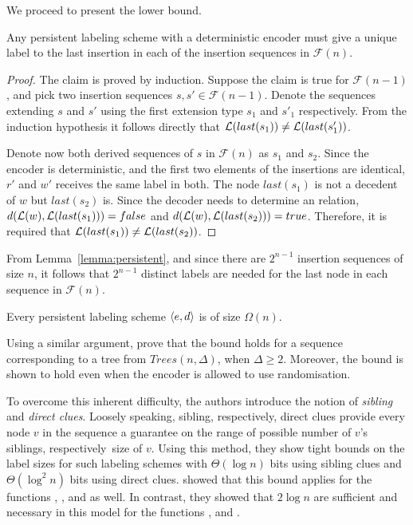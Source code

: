 			We proceed to present the lower bound.
			\begin{lemma}\label{lemma:persistent}\cite{Kaplan01}
				Any  persistent  \ancestry labeling scheme with a deterministic encoder must give a unique label to the last insertion in  each of the  insertion sequences in $\mathcal{F}(n)$. 
			\end{lemma}

			\begin{proof}
				The claim is proved by induction.
				Suppose the claim is true for $\mathcal{F}(n-1)$, and pick two  insertion sequences $s, s' \in \mathcal{F}(n-1)$.
				 Denote the  sequences  extending  $s$ and $s'$ using  the first extension  type $s_1$ and $s'_1$ respectively.
				From the induction hypothesis it follows directly that $ \mathcal{L}(last(s_1)) \neq  \mathcal{L}(last(s_1'))$. %
				
				Denote now both  derived sequences of $s$ in $\mathcal{F}(n)$ as  $s_1$ and $s_2$.
				Since the encoder is deterministic, and the first two elements of the insertions are identical,  $r'$ and $w'$ receives the same label in both.
				The node $last(s_1)$ is not a decedent of $w$ but $last(s_2)$ is.
				 Since the decoder needs to determine an \ancestry relation, $d( \mathcal{L}(w), \mathcal{L}(last(s_1))) = false$ and $d( \mathcal{L}(w), \mathcal{L}(last(s_2))) = true$.
				  Therefore, it is required that $ \mathcal{L}(last(s_1)) \neq  \mathcal{L}(last(s_2))$. 
			\end{proof}
				
				From Lemma~\ref{lemma:persistent}, and since there are $2^{n-1}$ insertion sequences of size $n$, it follows that $2^{n-1}$ distinct labels are needed for the last node in each sequence in $\mathcal{F}(n)$.
			\begin{corollary} \label{cor:persistent}
				Every persistent \ancestry labeling scheme  $\left \langle e,d \right \rangle $ is of size $\Omega(n)$.
			\end{corollary}
			Using a similar argument,   prove that the bound  holds for  a sequence corresponding to a tree from $Trees(n,\Delta)$, when $\Delta \geq 2$.
			Moreover, the bound is shown to hold even when the encoder is allowed to use randomisation.
			

		To overcome this inherent difficulty, the authors introduce the notion of \emph{sibling} and \emph{direct clues}.
			Loosely speaking, sibling, respectively, direct clues provide every node $v$ in the sequence a guarantee on the  range of possible number of $v$'s siblings, respectively~size of $v$.
		Using this method, they show tight bounds on the label sizes for such labeling schemes with  $\Theta(\log n)$ bits using sibling clues  and  $\Theta( \log^2 n)$ bits using direct clues.  showed that this bound applies for the functions \NCA, \distance, and \routing as well. In contrast, they showed that $2 \log n$ are sufficient and necessary in this model for the functions \adjacency, \siblings and \connectivity.	
			

